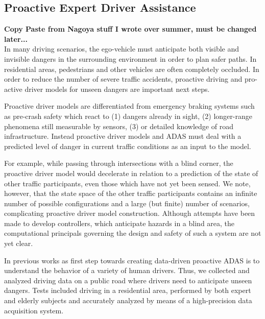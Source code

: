 \documentclass{easychair}
\theoremstyle{theorem}
\theoremstyle{remark}
\begin{document}
\subsection{Proactive Expert Driver Assistance}
\textbf{Copy Paste from Nagoya stuff I wrote over summer, must be changed later...}\\
In many driving scenarios, the ego-vehicle must anticipate both visible and invisible dangers in the surrounding environment in order to plan safer paths. In residential areas, pedestrians and other vehicles are often completely occluded. In order to reduce the number of severe traffic accidents, proactive driving and pro-active driver models for unseen dangers are important next steps.

Proactive driver models are differentiated from emergency braking systems such as pre-crash safety which react to (1) dangers already in sight, (2) longer-range phenomena still measurable by sensors, (3) or detailed knowledge of road infrastructure. Instead proactive driver models and ADAS must deal with a predicted level of danger in current traffic conditions as an input to the model. 

For example, while passing through intersections with a blind corner, the proactive driver model would decelerate in relation to a prediction of the state of other traffic participants, even those which have not yet been sensed. We note, however, that the state space of the other traffic participants contains an infinite number of possible configurations and a large (but finite) number of scenarios, complicating proactive driver model construction. Although attempts have been made to develop controllers, which anticipate hazards in a blind area, the computational principals governing the design and safety of such a system are not yet clear. 

In previous works as first step towards creating data-driven proactive ADAS is to understand the behavior of a variety of human drivers. Thus, we collected and analyzed driving data on a public road where drivers need to anticipate unseen dangers. Tests included driving in a residential area, performed by both expert and elderly subjects and accurately analyzed by means of a high-precision data acquisition system. 



\end{document}
